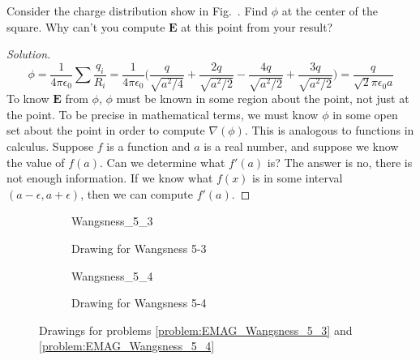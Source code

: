 \documentclass[crop=false,class=article,oneside]{standalone}
\begin{document}
        \begin{problem}[Wangsness 5-4]
            \label{problem:EMAG_Wangsness_5_4}
            Consider the charge distribution show in
            Fig.~.
            Find $\phi$ at the center of the square.
            Why can't you compute $\mathbf{E}$ at this
            point from your result?
        \end{problem}
        \begin{proof}[Solution]
        \begin{equation*}
            \phi=\frac{1}{4\pi\epsilon_{0}}
            \sum\frac{q_{i}}{R_{i}}
            =\frac{1}{4\pi \epsilon_0}\bigg(
                \frac{q}{\sqrt{a^2/4}}
                +\frac{2q}{\sqrt{a^2/2}}
                -\frac{4q}{\sqrt{a^2/2}}
                +\frac{3q}{\sqrt{a^2/2}}
            \bigg)
            =\frac{q}{\sqrt{2}\pi\epsilon_{0}a}    
        \end{equation*}
        To know $\mathbf{E}$ from $\phi$,
        $\phi$ must be known in some region about the point,
        not just at the point. To be precise in mathematical terms,
        we must know $\phi$ in some open set about the point in
        order to compute $\nabla(\phi)$. This is analogous to
        functions in calculus. Suppose $f$ is a function and
        $a$ is a real number, and suppose we know the value
        of $f(a)$. Can we determine what $f'(a)$ is?
        The answer is no, there is not enough information.
        If we know what $f(x)$ is in some interval $(a-\epsilon,a+\epsilon)$, then we can compute $f'(a)$.
        \end{proof}
        \begin{figure}[H]
            \centering
            \captionsetup{type=figure}
            \begin{subfigure}[b]{0.49\textwidth}
                \centering
                {Wangsness_5_3}
                \caption{Drawing for Wangsness 5-3}
                \label{fig:EMAG_Wangsness_5_3}
            \end{subfigure}
            \begin{subfigure}[b]{0.49\textwidth}
                \centering
                {Wangsness_5_4}
                \caption{Drawing for Wangsness 5-4}
                \label{fig:EMAG_Wangsness_5_4}
            \end{subfigure}
            \caption{%
                Drawings for problems
                \ref{problem:EMAG_Wangsness_5_3}
                and
                \ref{problem:EMAG_Wangsness_5_4}
            }
        \end{figure}
\end{document}
